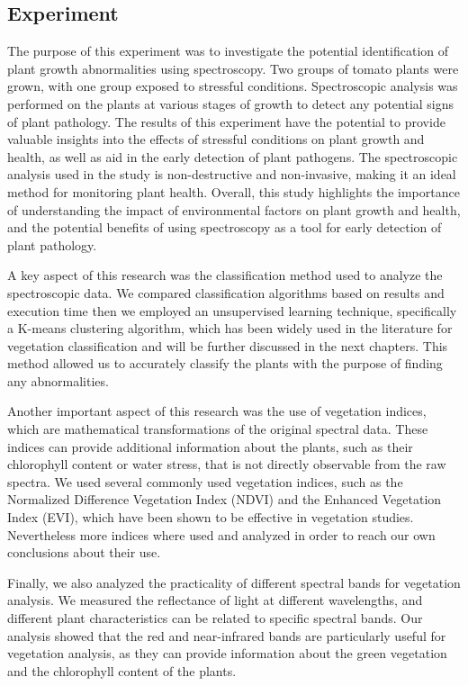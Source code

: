 \documentclass{article}
\begin{document}
{            \subsection{Experiment}
                    \hspace{0.5cm}The purpose of this experiment was to investigate the potential identification of plant growth abnormalities using spectroscopy. Two groups of tomato plants were grown, with one group exposed to stressful conditions. Spectroscopic analysis was performed
                    on the plants at various stages of growth to detect any potential signs of plant pathology. The results of this experiment have the potential to provide valuable insights into the effects of stressful conditions on plant growth and health, as well as aid in the early detection of plant pathogens. The spectroscopic analysis used in the study is non-destructive and non-invasive, making it an ideal method for monitoring plant health. Overall, this study highlights the importance of understanding the impact of environmental factors on plant growth and health, and the potential benefits of using spectroscopy as a tool for early detection of plant pathology.\par 
                    A key aspect of this research was the classification method used to analyze the spectroscopic data. We compared classification algorithms based on results and execution time then we employed an unsupervised learning technique, specifically a K-means clustering algorithm, which has been widely used in the literature for vegetation classification and will be further discussed in the next chapters. This method allowed us to accurately classify the plants with the purpose of finding any abnormalities.\par 
                    Another important aspect of this research was the use of vegetation indices, which are mathematical transformations of the original spectral data. These indices can provide additional information about the plants, such as their chlorophyll content or water stress, that is not directly observable from the raw spectra. We used several commonly used vegetation indices, such as the Normalized Difference Vegetation Index (NDVI) and the Enhanced Vegetation Index (EVI), which have been shown to be effective in vegetation studies. Nevertheless more indices where used and analyzed in order to reach our own conclusions about their use.\par 
                    Finally, we also analyzed the practicality of different spectral bands for vegetation analysis. We measured the reflectance of light at different wavelengths, and different plant characteristics can be related to specific spectral bands. Our analysis showed that the red and near-infrared bands are particularly useful for vegetation analysis, as they can provide information about the green vegetation and the chlorophyll content of the plants.\par 
}
\end{document}
